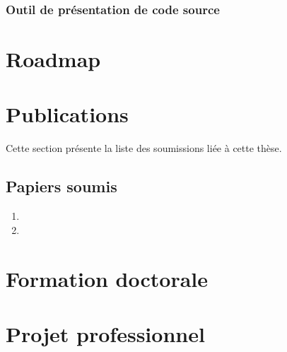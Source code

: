 \documentclass[a4paper]{article}
\begin{document}
\subsubsection{Outil de présentation de code source}

\section{Roadmap}
\label{sec:roadmap}

\section{Publications}

Cette section présente la liste des  soumissions liée à cette thèse.


\subsection{Papiers soumis}

\begin{enumerate}
  \item 
  \item 
\end{enumerate}

\section{Formation doctorale}


\section{Projet professionnel}



\footnotesize{
  
  
}
\end{document}
